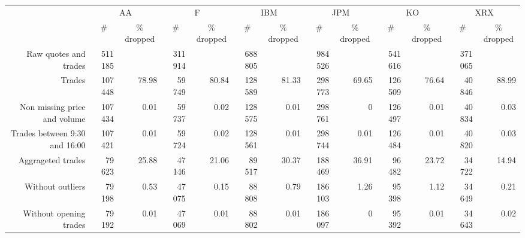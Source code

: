 \begin{tabular}{rrrrrrrrrrrrr} \toprule 
 & \multicolumn{2}{c}{AA}& \multicolumn{2}{c}{F}& \multicolumn{2}{c}{IBM}& \multicolumn{2}{c}{JPM}& \multicolumn{2}{c}{KO}& \multicolumn{2}{c}{XRX} \\ 
\cmidrule(r){2-3} \cmidrule(r){4-5} \cmidrule(r){6-7} \cmidrule(r){8-9} \cmidrule(r){10-11} \cmidrule(r){12-13} &  \multicolumn{1}{c}{$ \# $}&  \multicolumn{1}{c}{$ \% $ dropped}&  \multicolumn{1}{c}{$ \# $}&  \multicolumn{1}{c}{$ \% $ dropped}&  \multicolumn{1}{c}{$ \# $}&  \multicolumn{1}{c}{$ \% $ dropped}&  \multicolumn{1}{c}{$ \# $}&  \multicolumn{1}{c}{$ \% $ dropped}&  \multicolumn{1}{c}{$ \# $}&  \multicolumn{1}{c}{$ \% $ dropped}&  \multicolumn{1}{c}{$ \# $}&  \multicolumn{1}{c}{$ \% $ dropped} \\ \midrule 
 Raw quotes and trades& 511 185& & 311 914& & 688 805& & 984 526& & 541 616& & 371 065&  \\ 
Trades& 107 448&78.98&59 749&80.84& 128 589&81.33& 298 773&69.65& 126 509&76.64&40 846&88.99 \\ 
Non missing price and volume& 107 434&0.01&59 737&0.02& 128 575&0.01& 298 761&0& 126 497&0.01&40 834&0.03 \\ 
Trades between 9:30 and 16:00& 107 421&0.01&59 724&0.02& 128 561&0.01& 298 744&0.01& 126 484&0.01&40 820&0.03 \\ 
Aggrageted trades&79 623&25.88&47 146&21.06&89 517&30.37& 188 469&36.91&96 482&23.72&34 722&14.94 \\ 
Without outliers&79 198&0.53&47 075&0.15&88 808&0.79& 186 103&1.26&95 398&1.12&34 649&0.21 \\ 
Without opening trades&79 192&0.01&47 069&0.01&88 802&0.01& 186 097&0&95 392&0.01&34 643&0.02 \\ \bottomrule 
\end{tabular}
